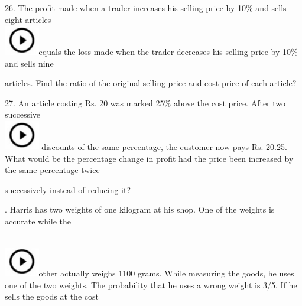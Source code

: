 \documentclass{article}
\begin{document}
	\noindent 
	
	\noindent 
	
	\noindent 
	
	\noindent 
	
	26. The profit made when a trader increases his selling price by 10\% and sells eight articles \noindent \\ \includegraphics*[width=0.60in, height=0.52in]{images/image1}equals the loss made when the trader decreases his selling price by 10\% and sells nine
	
	\noindent articles. Find the ratio of the original selling price and cost price of each article?
	
	\noindent 
	
	\noindent 
	
	\noindent 
	
	27. An  article  costing  Rs.  20  was  marked  25\%  above  the  cost  price.  After  two  successive \noindent \\ \includegraphics*[width=0.60in, height=0.52in]{images/image1} discounts of the same percentage, the customer now pays Rs. 20.25. What would be the percentage change in profit had the price been increased by the same percentage twice
	
	\noindent 
	
	\noindent successively instead of reducing it?
	
	\noindent 
	
	. Harris has two weights of one kilogram at his shop. One of the weights is accurate while the
	
	\noindent \noindent \\ \includegraphics*[width=0.60in, height=0.52in]{images/image1}other actually weighs 1100 grams. While measuring the goods, he uses one of the two weights. The probability that he uses a wrong weight is 3/5. If he sells the goods at the cost
	
	\noindent 
	
\end{document}
